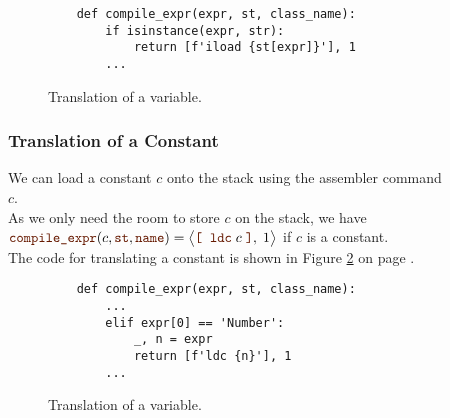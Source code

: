 \begin{figure}[!ht]
\centering
\begin{verbatim}
    def compile_expr(expr, st, class_name):
        if isinstance(expr, str):
            return [f'iload {st[expr]}'], 1
        ...
\end{verbatim}
\vspace*{-0.3cm}
\caption{Translation of a variable.}
\label{fig:Compiler.ipynb:compile:var}
\end{figure}

\subsubsection{Translation of a Constant}
We can load a constant $c$ onto the stack using the assembler command 
\\[0.2cm]
\hspace*{1.3cm}
 $c$.
\\[0.2cm]
As we only need the room to store $c$ on the stack, we have
\\[0.2cm]
\hspace*{1.3cm}
$\mytt{compile\_expr}(c, \mytt{st}, \mytt{name}) = 
 \bigl\langle\mytt{[}\;\; \mytt{ldc}\; c \;\mytt{]}, \; 1\bigr\rangle$ \quad
 if $c$ is a constant.
\\[0.2cm]
The code for translating a constant is shown in Figure \ref{fig:Compiler.ipynb:compile:const} on page
\pageref{fig:Compiler.ipynb:compile:const}.

\begin{figure}[!ht]
\centering
\begin{verbatim}
    def compile_expr(expr, st, class_name):
        ...
        elif expr[0] == 'Number':
            _, n = expr
            return [f'ldc {n}'], 1
        ...
\end{verbatim}
\vspace*{-0.3cm}
\caption{Translation of a variable.}
\label{fig:Compiler.ipynb:compile:const}
\end{figure}

